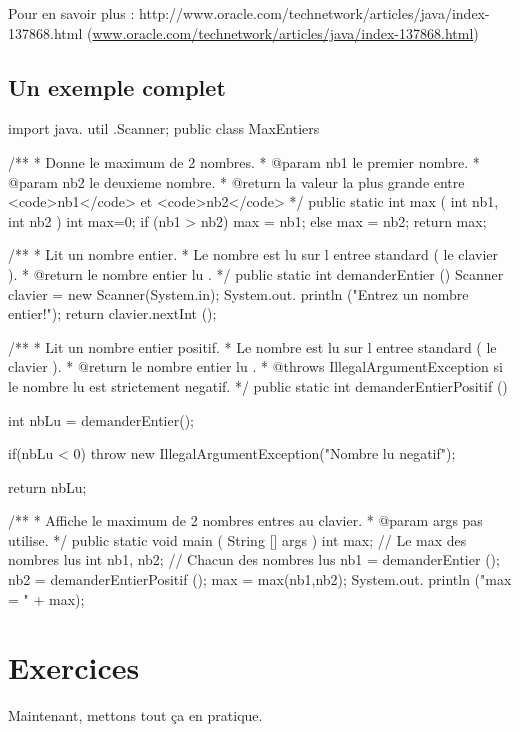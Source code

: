 \documentclass[11pt,a4paper]{article}
\begin{document}
            \par
        
        Pour en savoir plus : 
        http://www.oracle.com/technetwork/articles/java/index-137868.html (\url{www.oracle.com/technetwork/articles/java/index-137868.html})
            \par
        \subsection{Un exemple complet}\begin{Java}

import java. util .Scanner;
public class MaxEntiers {
    /**
    * Donne le maximum de 2 nombres.
    * @param nb1 le premier nombre.
    * @param nb2 le deuxieme nombre.
    * @return la valeur la plus grande entre <code>nb1</code> et <code>nb2</code>
    */
    public static int max ( int nb1, int nb2 ) {
      int max=0;
      if (nb1 > nb2) {
        max = nb1;
      } else {
        max = nb2;
      }
      return max;
    }
    
    /**
    * Lit un nombre entier.
    * Le nombre est lu sur l entree standard ( le clavier ).
    * @return le nombre entier lu .
    */
    public static int demanderEntier () {
      Scanner clavier = new Scanner(System.in);
      System.out. println ("Entrez un nombre entier!");
      return clavier.nextInt ();
    }
    
    /**
    * Lit un nombre entier positif.
    * Le nombre est lu sur l entree standard ( le clavier ).
    * @return le nombre entier lu .
    * @throws IllegalArgumentException si le nombre lu est strictement negatif.
    */
    public static int demanderEntierPositif () {
      int nbLu = demanderEntier();
      
      if(nbLu < 0)
        throw new IllegalArgumentException("Nombre lu negatif");
      
      return nbLu;
    }
    
    /**
    * Affiche le maximum de 2 nombres entres au clavier.
    * @param args pas utilise.
    */
    public static void main ( String [] args ) {
      int max; // Le max des nombres lus
      int nb1, nb2; // Chacun des nombres lus
      nb1 = demanderEntier ();
      nb2 = demanderEntierPositif ();
      max = max(nb1,nb2);
      System.out. println ("max = " + max);
    }
}				\end{Java}\section{Exercices}
				Maintenant, mettons tout \c ca en pratique.
      
\end{document}
